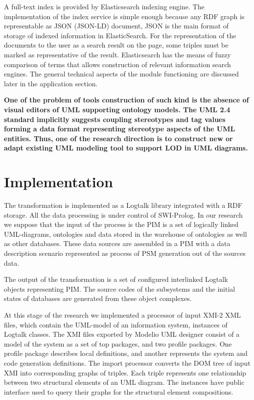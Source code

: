 \documentclass[conference,a4paper]{IEEEtran}
\begin{document}
A full-text index is provided by Elasticsearch indexing engine. The implementation of the index service is simple enough because any RDF graph is representable as JSON (JSON-LD) document, JSON is the main format of storage of indexed information in ElasticSearch. For the representation of the documents to the user as a search result on the page, some triples must be marked as representative of the result. Elasticsearch has the means of fuzzy comparison of terms that allows construction of relevant information search engines. The general technical aspects of the module functioning are discussed later in the application section.


\textbf{One of the problem of tools construction of such kind is the absence of visual editors of UML supporting ontology models.  The UML 2.4 standard implicitly suggests coupling stereotypes and tag values forming a data format representing stereotype aspects of the UML entities.  Thus, one of the research direction is to construct new or adapt existing UML modeling tool to support LOD in UML diagrams.
}


\section{Implementation}
\label{sec:impl}

The transformation is implemented as a Logtalk library integrated with a RDF storage.  All the data processing is under control of SWI-Prolog.  In our research we suppose that the input of the process is the PIM is a set of logically linked UML-diagrams, ontologies and data stored in the warehouse of ontologies as well as other databases.  These data sources are assembled in a PIM with a data description scenario represented as process of PSM generation out of the sources data.

The output of the transformation is a set of configured interlinked Logtalk objects representing PIM.  The source codes of the subsystems and the initial states of databases are generated from these object complexes.

At this stage of the research we implemented a processor of input XMI-2 XML files, which contain the UML-model of an information system, instances of Logtalk classes.  The XMI files exported by Modelio UML designer consist of a model of the system as a set of top packages, and two profile packages.  One profile package describes local definitions, and another represents the system and code generation definitions.  The import processor converts the DOM tree of input XMI into corresponding graphs of triples.  Each triple represents one relationship between two structural elements of an UML diagram.  The instances have public interface used to query their graphs for the structural element compositions.
\end{document}
